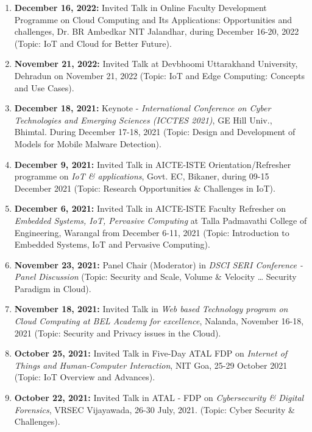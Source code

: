 \begin{enumerate} %
\item
\textbf{December 16, 2022:} Invited Talk in Online Faculty Development Programme on Cloud Computing and Its Applications: Opportunities and challenges, Dr. BR Ambedkar NIT Jalandhar, during December 16-20, 2022 (Topic: IoT and Cloud for Better Future).

\item
\textbf{November 21, 2022:} Invited Talk at Devbhoomi Uttarakhand University, Dehradun on November 21, 2022 (Topic: IoT and Edge Computing: Concepts and Use Cases).

\item
\textbf{December 18, 2021:} Keynote - \textit{International Conference on Cyber Technologies and Emerging Sciences (ICCTES 2021)}, GE Hill Univ., Bhimtal. During December 17-18, 2021 (Topic: Design and Development of Models for Mobile Malware Detection).

\item
\textbf{December 9, 2021:} Invited Talk in AICTE-ISTE Orientation/Refresher programme on \textit{IoT \& applications}, Govt. EC, Bikaner, during 09-15 December 2021 (Topic: Research Opportunities \& Challenges in IoT).

\item
\textbf{December 6, 2021:} Invited Talk in AICTE-ISTE Faculty Refresher on \textit{Embedded Systems, IoT, Pervasive Computing} at Talla Padmavathi College of Engineering, Warangal from December 6-11, 2021 (Topic: Introduction to Embedded Systems, IoT and Pervasive Computing).

\item
\textbf{November 23, 2021:} Panel Chair (Moderator) in \textit{DSCI SERI Conference - Panel Discussion} (Topic: Security and Scale, Volume \& Velocity … Security Paradigm in Cloud).

\item
\textbf{November 18, 2021:} Invited Talk in \textit{Web based Technology program on Cloud Computing at BEL Academy for excellence}, Nalanda, November 16-18, 2021 (Topic: Security and Privacy issues in the Cloud).

\item
\textbf{October 25, 2021:} Invited Talk in Five-Day ATAL FDP on \textit{Internet of Things and Human-Computer Interaction}, NIT Goa, 25-29 October 2021 (Topic: IoT Overview and Advances).

\item
\textbf{October 22, 2021:} Invited Talk in ATAL - FDP on \textit{Cybersecurity \& Digital Forensics}, VRSEC Vijayawada, 26-30 July, 2021. (Topic: Cyber Security \& Challenges).


\end{enumerate}
